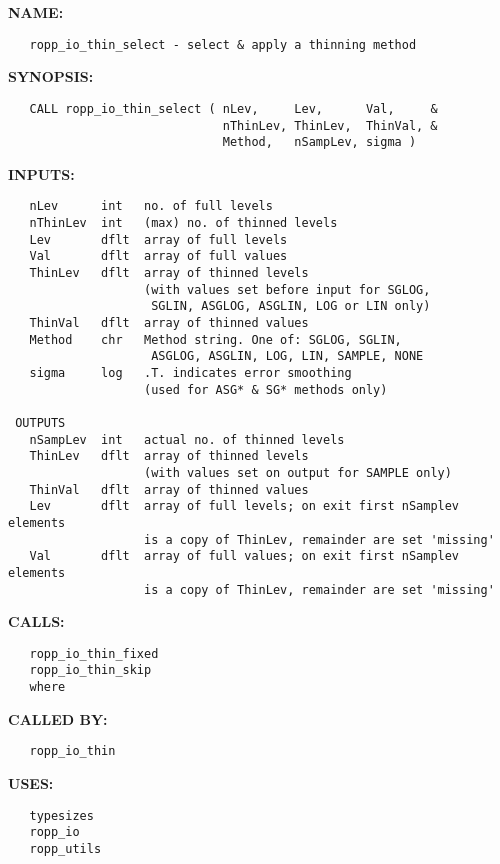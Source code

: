 \label{ch:robo109}
\label{ch:Thin_ropp_io_thin_select}
\textbf{NAME:}\hspace{0.08in}\begin{Verbatim}
   ropp_io_thin_select - select & apply a thinning method
\end{Verbatim}
\textbf{SYNOPSIS:}\hspace{0.08in}\begin{Verbatim}
   CALL ropp_io_thin_select ( nLev,     Lev,      Val,     &
                              nThinLev, ThinLev,  ThinVal, &
                              Method,   nSampLev, sigma )
\end{Verbatim}
\textbf{INPUTS:}\hspace{0.08in}\begin{Verbatim}
   nLev      int   no. of full levels
   nThinLev  int   (max) no. of thinned levels
   Lev       dflt  array of full levels
   Val       dflt  array of full values
   ThinLev   dflt  array of thinned levels
                   (with values set before input for SGLOG,
                    SGLIN, ASGLOG, ASGLIN, LOG or LIN only)
   ThinVal   dflt  array of thinned values
   Method    chr   Method string. One of: SGLOG, SGLIN,
                    ASGLOG, ASGLIN, LOG, LIN, SAMPLE, NONE
   sigma     log   .T. indicates error smoothing
                   (used for ASG* & SG* methods only)

 OUTPUTS
   nSampLev  int   actual no. of thinned levels
   ThinLev   dflt  array of thinned levels
                   (with values set on output for SAMPLE only)
   ThinVal   dflt  array of thinned values
   Lev       dflt  array of full levels; on exit first nSamplev elements
                   is a copy of ThinLev, remainder are set 'missing'
   Val       dflt  array of full values; on exit first nSamplev elements
                   is a copy of ThinLev, remainder are set 'missing'
\end{Verbatim}
\textbf{CALLS:}\hspace{0.08in}\begin{Verbatim}
   ropp_io_thin_fixed
   ropp_io_thin_skip
   where
\end{Verbatim}
\textbf{CALLED BY:}\hspace{0.08in}\begin{Verbatim}
   ropp_io_thin
\end{Verbatim}
\textbf{USES:}\hspace{0.08in}\begin{Verbatim}
   typesizes
   ropp_io
   ropp_utils
\end{Verbatim}

